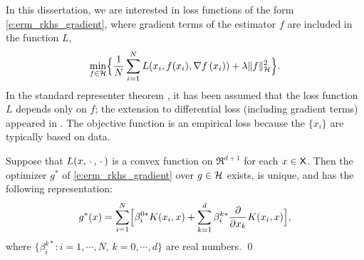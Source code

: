 In this dissertation, we are interested in loss functions of the form \eqref{e:erm_rkhs_gradient}, where gradient terms of the estimator $f$ are included in the function $L$,
\begin{equation}
\min_{f\in\clH} \Bigl\{  \frac{1}{N} \sum_{i=1}^N L(x_i,  f(x_i), \nabla f\, (x_i))     + \lambda \| f\|^2_{\clH}  \Bigr\}.
\label{e:erm_rkhs_gradient}
\end{equation}
In the standard representer theorem , it has been assumed that the loss function $L$ depends only on $f$;  the extension to differential loss (including gradient terms) appeared in \cite{zho08}.    The objective function is an empirical loss  because the $\{x_i\}$ are typically based on data.
\begin{theorem}
	\label{theorem:ext_rep_theorem}
	Suppose that $L(x,\,\cdot\,,\,\cdot\,)$ is a convex function on $\Re^{d+1}$ for each $x\in{\sf X}$.
	Then the  optimizer $g^*$ of \eqref{e:erm_rkhs_gradient} over $g\in{\cal H}$ exists, is unique, and has the following representation:
	\[
	g^*(x) = \sum_{i=1}^N  \Bigl[
	\beta_i^{0*}  K(x_i,x)   +  \sum_{k =1}^d  \beta_i^{k*} \frac{\partial}{\partial x_k}  K(x_i, x) \Bigr],
	\]
	where $\{\beta_i^{k*} \colon i=1,\cdots,N,\, k = 0,\cdots,d\}$ are real numbers.
	\qed
\end{theorem}
